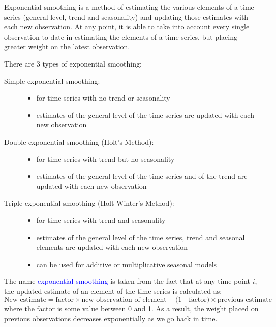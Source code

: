 \documentclass[12pt,a4paper,openany,twoside]{report}
\newcommand{\blue}{\textcolor{blue}}
\newcommand{\emphx}[1]{\blue{#1}}
\theoremstyle{definition}
\theoremstyle{remark}
\theoremstyle{plain}
\theoremstyle{definition}
\theoremstyle{definition}
\theoremstyle{definition}
\theoremstyle{remark}
\begin{document}
Exponential smoothing is a method of estimating the various elements of
a time series (general level, trend and seasonality) and updating those
estimates with each new observation. At any point, it is able to take
into account every single observation to date in estimating the elements
of a time series, but placing greater weight on the latest observation.

\newpage

There are 3 types of exponential smoothing:

\begin{description}
\item[Simple exponential smoothing:]  \phantom{This method}
\begin{itemize}
\item for time series with no trend or seasonality

\item estimates of the general level of the time series are updated with each new observation
\end{itemize}

\item[Double exponential smoothing (Holt's Method):] \phantom{This method}
\begin{itemize}
\item for time series with trend but no seasonality

\item estimates of the general level of the time series and of the trend are
  updated with each new observation
\end{itemize}

\item[Triple exponential smoothing (Holt-Winter's Method):]\phantom{This method}
\begin{itemize}
\item for time series with trend and seasonality

\item estimates of the general level of the time series, trend and seasonal
  elements are updated with each new observation

\item can be used for additive or multiplicative seasonal models
\end{itemize}
\end{description}

The name \emphx{exponential smoothing} is taken from the fact that at any time
point \(i\), the updated estimate of an element of the time series is
calculated as:
\[\mbox{New estimate} =  \mbox{factor}\times \mbox{new observation of element} + \mbox{(1 - factor)} \times \mbox{previous estimate}\]
where the factor is some value between 0 and 1. As a result, the weight
placed on previous observations decreases exponentially as we go back in
time.
\end{document}

